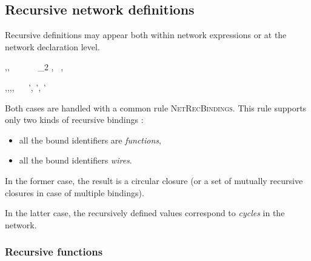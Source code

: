 \subsection{Recursive network definitions }
\label{sec:recurs-netw-decl}

Recursive definitions may appear both within network expressions or at the network declaration level.


{\TE,\EE,\NE \vdash {}~ ~ ~ ~ _2 \gives \rho,~ \BB,~ \WW}


{\TE,\EE,\NE,\BB,\WW \vdash {}~ ~  \gives \NE \oplus \NE', \BB \oplus \BB', \WW \oplus
  \WW'}

Both cases are handled with a common rule \textsc{NetRecBindings}.
This rule supports only two kinds of recursive bindings :
\begin{itemize}
\item all the bound identifiers are \emph{functions},
\item all the bound identifiers \emph{wires}.
\end{itemize}

In the former case, the result is a circular closure (or a set of mutually recursive closures in
case of multiple bindings).

In the latter case, the recursively defined values correspond to \emph{cycles} in the network.

\subsubsection{Recursive functions}
\label{sec:recursive-functions}


